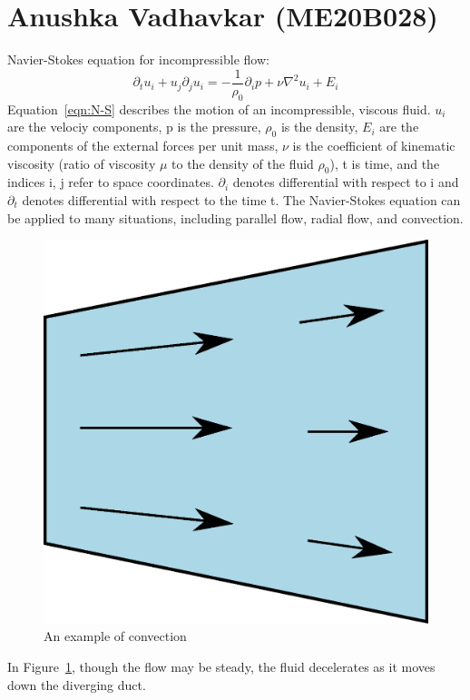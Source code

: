 \documentclass[12pt,a4paper,final]{article}
\begin{document}
\section{Anushka Vadhavkar (ME20B028)}
\smallskip
Navier-Stokes equation for incompressible flow\cite{Chorin}:
\smallskip
\begin{equation}
\partial_{t}u_{i}+u_{j}\partial_{j}u_{i}=-\frac{1}{\rho_{0}}\partial_{i}p+\nu\nabla^2u_{i}+E_{i}
\label{eqn:N-S} 
\end{equation}
Equation~\ref{eqn:N-S} describes the motion of an incompressible, viscous fluid. $u_{i}$ are the velociy components, p is the pressure, $\rho_{0}$ is the density, $E_{i}$ are the components of the external forces per unit mass, $\nu$ is the coefficient of kinematic viscosity (ratio of viscosity $\mu$ to the density of the fluid $\rho_{0}$), t is time, and the indices i, j refer to space coordinates. $\partial_{i}$ denotes differential with respect to i and $\partial_{t}$ denotes differential with respect to the time t. The Navier-Stokes equation can be applied to many situations, including parallel flow, radial flow, and convection.
\medskip
\begin{figure}[h]
\begin{center}
	\includegraphics[scale=0.25]{ME20B028.eps}
\end{center}
\caption{An example of convection}
\label{fig:convection} 
\end{figure}

In Figure~\ref{fig:convection}, though the flow may be steady, the fluid decelerates as it moves down the diverging duct.



\end{document}
